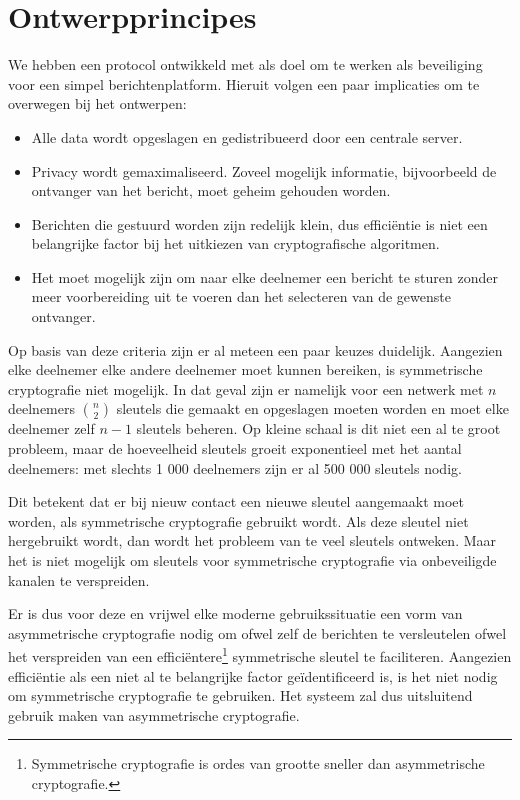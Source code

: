 \documentclass{report} %
\begin{document}
\section{Ontwerpprincipes}
We hebben een protocol ontwikkeld met als doel om te werken als beveiliging voor een simpel berichtenplatform. Hieruit volgen een paar implicaties om te overwegen bij het ontwerpen:
\begin{itemize}
    \item Alle data wordt opgeslagen en gedistribueerd door een centrale server.
    \item Privacy wordt gemaximaliseerd. Zoveel mogelijk informatie, bijvoorbeeld de ontvanger van het bericht, moet geheim gehouden worden.
    \item Berichten die gestuurd worden zijn redelijk klein, dus efficiëntie is niet een belangrijke factor bij het uitkiezen van cryptografische algoritmen.
    \item Het moet mogelijk zijn om naar elke deelnemer een bericht te sturen zonder meer voorbereiding uit te voeren dan het selecteren van de gewenste ontvanger.
\end{itemize}

Op basis van deze criteria zijn er al meteen een paar keuzes duidelijk. Aangezien elke deelnemer elke andere deelnemer moet kunnen bereiken, is symmetrische cryptografie niet mogelijk. In dat geval zijn er namelijk voor een netwerk met $n$ deelnemers $n \choose 2$ sleutels die gemaakt en opgeslagen moeten worden en moet elke deelnemer zelf $n-1$ sleutels beheren. Op kleine schaal is dit niet een al te groot probleem, maar de hoeveelheid sleutels groeit exponentieel met het aantal deelnemers: met slechts 1 000 deelnemers zijn er al 500 000 sleutels nodig. 
\par Dit betekent dat er bij nieuw contact een nieuwe sleutel aangemaakt moet worden, als symmetrische cryptografie gebruikt wordt. Als deze sleutel niet hergebruikt wordt, dan wordt het probleem van te veel sleutels ontweken. Maar het is niet mogelijk om sleutels voor symmetrische cryptografie via onbeveiligde kanalen te verspreiden.
\par Er is dus voor deze en vrijwel elke moderne gebruikssituatie een vorm van asymmetrische cryptografie nodig om ofwel zelf de berichten te versleutelen ofwel het verspreiden van een efficiëntere\footnote{Symmetrische cryptografie is ordes van grootte sneller dan asymmetrische cryptografie.} symmetrische sleutel te faciliteren. Aangezien efficiëntie als een niet al te belangrijke factor geïdentificeerd is, is het niet nodig om symmetrische cryptografie te gebruiken. Het systeem zal dus uitsluitend gebruik maken van asymmetrische cryptografie.
\end{document}
